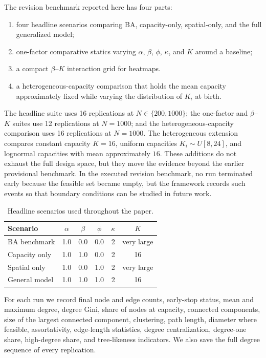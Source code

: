 \documentclass[11pt]{article}
\begin{document}
The revision benchmark reported here has four parts:
\begin{enumerate}[leftmargin=1.5em]
    \item four headline scenarios comparing BA, capacity-only, spatial-only, and the full generalized model;
    \item one-factor comparative statics varying $\alpha$, $\beta$, $\phi$, $\kappa$, and $K$ around a baseline;
    \item a compact $\beta$--$K$ interaction grid for heatmaps.
    \item a heterogeneous-capacity comparison that holds the mean capacity approximately fixed while varying the distribution of $K_i$ at birth.
\end{enumerate}

The headline suite uses 16 replications at $N\in\{200,1000\}$; the one-factor and $\beta$--$K$ suites use 12 replications at $N=1000$; and the heterogeneous-capacity comparison uses 16 replications at $N=1000$. The heterogeneous extension compares constant capacity $K=16$, uniform capacities $K_i\sim U[8,24]$, and lognormal capacities with mean approximately $16$. These additions do not exhaust the full design space, but they move the evidence beyond the earlier provisional benchmark. In the executed revision benchmark, no run terminated early because the feasible set became empty, but the framework records such events so that boundary conditions can be studied in future work.

\begin{table}[htbp]
\centering
\caption{Headline scenarios used throughout the paper.}
\label{tab:headline-scenarios}
\begin{tabular}{lccccc}
\toprule
Scenario & $\alpha$ & $\beta$ & $\phi$ & $\kappa$ & $K$ \\
\midrule
BA benchmark & 1.0 & 0.0 & 0.0 & 2 & very large \\
Capacity only & 1.0 & 1.0 & 0.0 & 2 & 16 \\
Spatial only & 1.0 & 0.0 & 1.0 & 2 & very large \\
General model & 1.0 & 1.0 & 1.0 & 2 & 16 \\
\bottomrule
\end{tabular}
\end{table}

For each run we record final node and edge counts, early-stop status, mean and maximum degree, degree Gini, share of nodes at capacity, connected components, size of the largest connected component, clustering, path length, diameter where feasible, assortativity, edge-length statistics, degree centralization, degree-one share, high-degree share, and tree-likeness indicators. We also save the full degree sequence of every replication.
\end{document}
